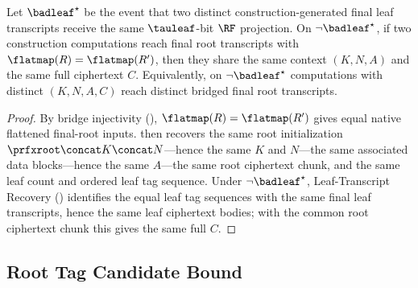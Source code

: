 \begin{proposition}
\label{prop:final-root-sep}
Let $\badleaf^\star$ be the event that two distinct construction-generated
final leaf transcripts receive the same $\tauleaf$-bit $\RF$ projection.
On $\neg\badleaf^\star$, if two \TW{} construction computations reach
final root transcripts with $\flatmap(R) = \flatmap(R')$, then they share
the same context $(K, N, A)$ and the same full ciphertext $C$.
Equivalently, on $\neg\badleaf^\star$ computations with distinct
$(K, N, A, C)$ reach distinct bridged final root transcripts.
\end{proposition}

\begin{proof}
By bridge injectivity (),
$\flatmap(R) = \flatmap(R')$ gives equal native flattened final-root
inputs.  then recovers the same root
initialization $\prfxroot \concat K \concat N$---hence the same $K$ and
$N$---the same associated data blocks---hence the same $A$---the same root
ciphertext chunk, and the same leaf count and ordered leaf tag sequence.
Under $\neg\badleaf^\star$, Leaf-Transcript Recovery
() identifies the equal leaf tag sequences with
the same final leaf transcripts, hence the same leaf ciphertext bodies;
with the common root ciphertext chunk this gives the same full $C$.
\end{proof}

\subsection{Root Tag Candidate Bound}

